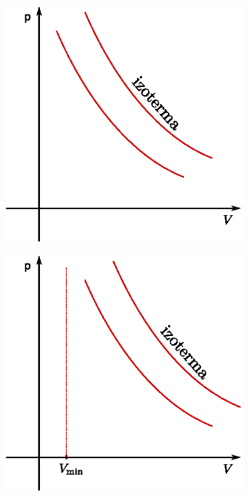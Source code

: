 \begin{figure}[!h]
    \centering
    \begin{subfigure}[t]{0.45\textwidth}
            \centering
            \includegraphics[width=\textwidth]{termo_4/termo_4_1}
            \label{fig:termo_4_1}
    \end{subfigure}\hfill
    \begin{subfigure}[t]{0.45\textwidth}
            \centering
            \includegraphics[width=\textwidth]{termo_4/termo_4_2}
            \label{fig:termo_4_2}
    \end{subfigure}
\end{figure}
